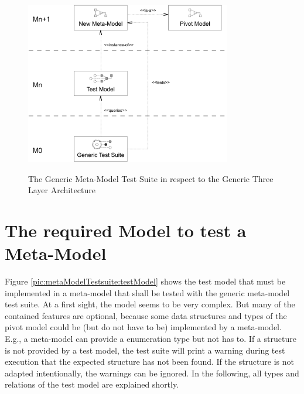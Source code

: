 \begin{figure}[!t]
	\centering
		\includegraphics[width=0.80\textwidth]{figures/metamodeltestsuite/genericTestSuite.pdf}
	\label{pic:metaModelTestsuite:genericTestSuite}
	\caption{The Generic Meta-Model Test Suite in respect to the Generic Three Layer Ar\-chi\-tec\-ture}
\end{figure}



\section{The required Model to test a Meta-Model}

Figure \ref{pic:metaModelTestsuite:testModel} shows the test model that must be implemented in a meta-model that shall be tested with the generic meta-model test suite. At a first sight, the model seems to be very complex. But many of the contained features are optional, because some data structures and types of the pivot model could be (but do not have to be) implemented by a meta-model. E.g., a meta-model can provide a enumeration type but not has to. If a structure is not provided by a test model, the test suite will print a warning during test execution that the expected structure has not been found. If the structure is not adapted intentionally, the warnings can be ignored. In the following, all types and relations of the test model are explained shortly.

